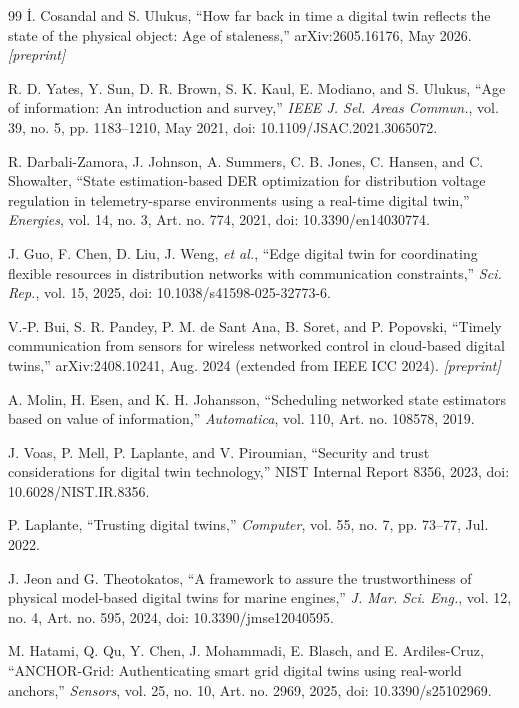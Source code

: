 \documentclass[journal]{IEEEtran}
\theoremstyle{plain}
\theoremstyle{definition}
\theoremstyle{remark}
\begin{document}
\begin{thebibliography}{99}
 \.{I}. Cosandal and S. Ulukus, ``How far back in time a digital twin reflects the state of the physical object: Age of staleness,'' arXiv:2605.16176, May 2026. \emph{[preprint]}

 R. D. Yates, Y. Sun, D. R. Brown, S. K. Kaul, E. Modiano, and S. Ulukus, ``Age of information: An introduction and survey,'' \emph{IEEE J. Sel. Areas Commun.}, vol. 39, no. 5, pp. 1183--1210, May 2021, doi: 10.1109/JSAC.2021.3065072.

 R. Darbali-Zamora, J. Johnson, A. Summers, C. B. Jones, C. Hansen, and C. Showalter, ``State estimation-based DER optimization for distribution voltage regulation in telemetry-sparse environments using a real-time digital twin,'' \emph{Energies}, vol. 14, no. 3, Art. no. 774, 2021, doi: 10.3390/en14030774.

 J. Guo, F. Chen, D. Liu, J. Weng, \emph{et al.}, ``Edge digital twin for coordinating flexible resources in distribution networks with communication constraints,'' \emph{Sci. Rep.}, vol. 15, 2025, doi: 10.1038/s41598-025-32773-6.

 V.-P. Bui, S. R. Pandey, P. M. de Sant Ana, B. Soret, and P. Popovski, ``Timely communication from sensors for wireless networked control in cloud-based digital twins,'' arXiv:2408.10241, Aug. 2024 (extended from IEEE ICC 2024). \emph{[preprint]}

 A. Molin, H. Esen, and K. H. Johansson, ``Scheduling networked state estimators based on value of information,'' \emph{Automatica}, vol. 110, Art. no. 108578, 2019.

 J. Voas, P. Mell, P. Laplante, and V. Piroumian, ``Security and trust considerations for digital twin technology,'' NIST Internal Report 8356, 2023, doi: 10.6028/NIST.IR.8356.

 P. Laplante, ``Trusting digital twins,'' \emph{Computer}, vol. 55, no. 7, pp. 73--77, Jul. 2022.

 J. Jeon and G. Theotokatos, ``A framework to assure the trustworthiness of physical model-based digital twins for marine engines,'' \emph{J. Mar. Sci. Eng.}, vol. 12, no. 4, Art. no. 595, 2024, doi: 10.3390/jmse12040595.

 M. Hatami, Q. Qu, Y. Chen, J. Mohammadi, E. Blasch, and E. Ardiles-Cruz, ``ANCHOR-Grid: Authenticating smart grid digital twins using real-world anchors,'' \emph{Sensors}, vol. 25, no. 10, Art. no. 2969, 2025, doi: 10.3390/s25102969.


\end{thebibliography}
\end{document}

